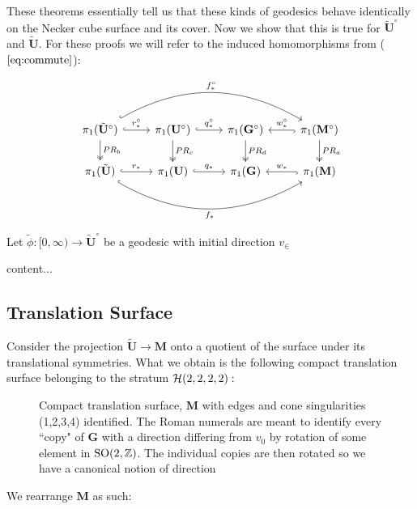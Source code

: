 \documentclass[]{article}
\def\bU{\mathbf{U}} \def\btU{\tilde{\bU}} \def\bUs{\bU^\circ}
\def\bG{\mathbf{G}} \def\bGs{\mathbf{G}^\circ}
\def\bM{\mathbf{M}}
\def\bMs{\mathbf{M}^\circ}
\def\btUs{\btU^\circ}
\def\SO{\mathrm{SO}}
\begin{document}
These theorems essentially tell us that these kinds of geodesics behave identically on the Necker cube surface and its cover. Now we show that this is true for $\btUs$ and $\btU$. For these proofs we will refer to the induced homomorphisms from ($\ref{eq:commute}$):

\begin{equation}
\begin{tikzcd}
\arrow[hookrightarrow, bend left]{rrr}{f_*^\circ}[swap]{} \arrow[two heads]{d}{PR_b} \pi_1(\btUs) \arrow[hook]{r}{r_*^\circ} & \pi_1(\bUs) \arrow[two heads]{d}{PR_c} \arrow[hook]{r}{q_*^\circ} & \pi_1(\bGs) \arrow[two heads]{d}{PR_d} & \ar[hookrightarrow]{l}{}[swap]{w_*^\circ} \pi_1(\bMs) \arrow[two heads]{d}{PR_a} \\
\arrow[hookrightarrow, bend right]{rrr}{}[swap]{f_*}  \pi_1(\btU) \arrow[hook]{r}{r_*} & \pi_1(\bU) \arrow[hook]{r}{q_*} & \pi_1(\bG) & \ar[hookrightarrow]{l}{}[swap]{w_*} \pi_1(\bM)\\
\end{tikzcd}
\label{eq:homomorphism}
\end{equation}

\begin{Def}
Let $\tilde{\phi}:[0,\infty)\rightarrow\btUs$ be a geodesic with initial direction $v_\in$ 
\end{Def}

\begin{thm}
content...
\end{thm}

\subsection{Translation Surface}
Consider the projection $\btU\rightarrow\mathbf{M}$ onto a quotient of the surface under its translational symmetries. What we obtain is the following compact translation surface belonging to the stratum $\mathcal{H}(2,2,2,2):$

\begin{figure}[H]
\centering

\caption{Compact translation surface, $\mathbf{M}$ with edges and cone singularities (1,2,3,4) identified. The Roman numerals are meant to identify every ``copy" of $\bG$ with a direction differing from $v_0$ by rotation of some element in $\SO(2,\ZZ)$. The individual copies are then rotated so we have a canonical notion of direction }
\label{fig:mtilda}
\end{figure}

We rearrange $\bM$ as such:
\end{document}
